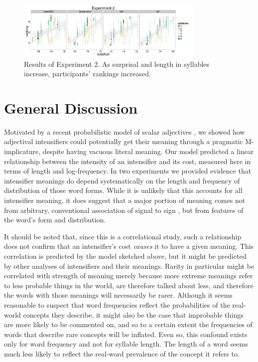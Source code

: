 \documentclass[10pt,letterpaper]{article}
\begin{document}
\begin{figure}[ht]
\begin{center}
\includegraphics[width=0.8\textwidth]{analysis_files_for_writeup/images/exp2-plot.png}
\end{center}
\caption{Results of Experiment 2. As surprisal and length in syllables increase, participants' rankings increased.} 
\label{exp2-plot}
\end{figure}

\section{General Discussion}

Motivated by a recent probabilistic model of scalar adjectives \cite{lassiter}, we showed how adjectival intensifiers could potentially get their meaning through a pragmatic M-implicature, despite having vacuous literal meaning. Our model predicted a linear relationship between the intensity of an intensifier and its cost, measured here in terms of length and log-frequency.
In two experiments we provided evidence that intensifier meanings do depend systematically on the length and frequency of distribution of those word forms.
While it is unlikely that this accounts for all intensifier meaning, it does suggest that a major portion of meaning comes not from arbitrary, conventional association of signal to sign \cite{saussure}, but from features of the word's form and distribution.

It should be noted that, since this is a correlational study, such a relationship does not confirm that an intensifier's cost \emph{causes} it to have a given meaning. This correlation is predicted by the model sketched above, but it might be predicted by other analyses of intensifiers and their meanings. Rarity in particular might be correlated with strength of meaning merely because more extreme meanings refer to less probable things in the world, are therefore talked about less, and therefore the words with those meanings will necessarily be rarer. Although it seems reasonable to suspect that word frequencies reflect the probabilities of the real-world concepts they describe, it might also be the case that improbable things are more likely to be commented on, and so to a certain extent the frequencies of words that describe rare concepts will be inflated. Even so, this confound exists only for word frequency and not for syllable length.
The length of a word seems much less likely to reflect the real-word prevalence of the concept it refers to.
\end{document}
